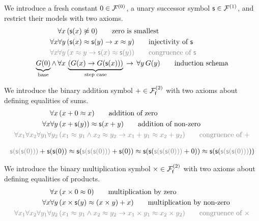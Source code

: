 \begin{definition}
	\label{def:natural:numbers:axioms}
	We introduce a fresh constant $0\in\mcFn[0]$, 
	a unary successor symbol $\msucc\in\mcFn[1]$,
	and restrict their models with two axioms. 
\begin{align*}
\forall x\, &(\msucc(x) \mNE 0)
\tag*{zero is smallest} 
\\ %
\forall x \forall y\, &(\msucc(x) \mEQ \msucc(y) \limp x \mEQ y)
\tag*{injectivity of $\msucc$}
\\
\colG\forall x\forall y\,&\colG(x\mEQ y \limp \msucc(x)\mEQ\msucc(y))
\tag*{congruence of $\msucc$}
\\ 
\underbrace{G(0)}_{\text{base}} 
\land\, \forall x\,&
\underbrace{
	\left(G(x) \limp G(\msucc(x))\right)
}_{\text{step case}}
\,\limp\, \forall y\,G(y)
\tag*{induction schema}
\end{align*}
\end{definition}

\begin{definition}
	[Addition]
	\label{def:addition:axioms}
	We introduce the binary addition symbol $+\in\mcFfn[2]$ with two axioms about defining equalities of sums.
\begin{align*}
\forall x\,
&(x+0 \mEQ x) 
\tag*{addition of zero}\\
\forall x\forall y\,
&(x+\msucc(y)) \mEQ \msucc(x+y)
\tag*{addition of non-zero}
\\
\colG\forall x_1\forall x_2\forall y_1\forall y_2\,
&\colG (x_1\mEQ y_1\land x_2\mEQ y_2 \limp x_1+y_1\mEQ x_2+y_2)
\tag*{congruence of $+$}
\end{align*}
\end{definition}

\begin{example}
	\begin{gather*}
	{\colG \msucc(\msucc(\msucc(0)))} + \msucc(\msucc(0))
	\mEQ\msucc({\colG \msucc(\msucc(\msucc(0)))} + \msucc(0)) 
	\mEQ \msucc(\msucc(
	{\colG \msucc(\msucc(\msucc(0)))} + 0))
	\mEQ \msucc(\msucc(
	{\colG \msucc(\msucc(\msucc(0)))}))
	\end{gather*}
	\end{example}

\begin{definition}
	[Multiplikation]
	\label{tab:addition:axioms}
	We introduce the binary multiplication symbol $\times\in\mcFfn[2]$
	with two axioms about defining equalities of products.
	\begin{align*}
	\forall x\,
	&(x\times 0 \mEQ 0) 
	\tag*{multiplication by zero}\\
	\forall x\forall y\,
	&(x\times\msucc(y) \mEQ (x\times y) + x)
	\tag*{multiplication by non-zero}
	\\
	\colG\forall x_1\forall x_2\forall y_1\forall y_2\,
	&\colG (x_1\mEQ y_1\land x_2\mEQ y_2 \limp x_1\times y_1\mEQ x_2 \times y_2)
	\tag*{congruence of $\times$}
	\end{align*}
\end{definition}

